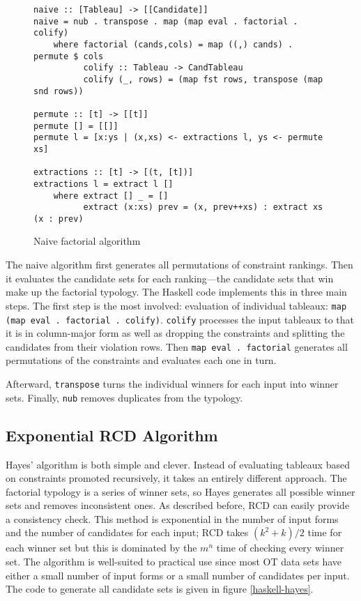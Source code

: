 \documentclass[11pt]{article}
\begin{document}
  \begin{figure}
\begin{verbatim}
naive :: [Tableau] -> [[Candidate]]
naive = nub . transpose . map (map eval . factorial . colify)
    where factorial (cands,cols) = map ((,) cands) . permute $ cols
          colify :: Tableau -> CandTableau
          colify (_, rows) = (map fst rows, transpose (map snd rows))

permute :: [t] -> [[t]]
permute [] = [[]]
permute l = [x:ys | (x,xs) <- extractions l, ys <- permute xs]

extractions :: [t] -> [(t, [t])]
extractions l = extract l []
    where extract [] _ = []
          extract (x:xs) prev = (x, prev++xs) : extract xs (x : prev)
\end{verbatim}
  \caption{Naive factorial algorithm}
  \label{naive-factorial-haskell2}
\end{figure}

The naive algorithm first generates all permutations of constraint
rankings. Then it evaluates the candidate sets for each ranking---the
candidate sets that win make up the factorial typology. The Haskell
code implements this in three main steps. The first step is the most
involved: evaluation of individual tableaux:
\verb+map (map eval . factorial . colify)+. {\tt colify}
 processes the input tableaux to that it is in column-major form as
 well as dropping the constraints and splitting the candidates
from their violation rows. Then {\tt map eval . factorial} generates
all permutations of the constraints and evaluates each one in turn.

Afterward, {\tt transpose} turns the individual winners for each input
into winner sets. Finally, {\tt nub} removes duplicates
from the typology.


\subsection{Exponential RCD Algorithm}

Hayes' algorithm is both simple and clever. Instead of evaluating
tableaux based on constraints promoted recursively, it takes an
entirely different approach. The factorial typology is a series of
winner sets, so Hayes generates all possible winner sets and removes
inconsistent ones. As described before, RCD can easily provide a
consistency check. This method is exponential in the number of input
forms and the number of candidates for each input; RCD takes $(k^2 + k)
/ 2$ time for each winner set but this is dominated by the $m^n$ time
of checking every winner set. The algorithm is well-suited to
practical use since most OT data sets have either a small number of
input forms or a small number of candidates per input. The code to
generate all candidate sets is given in figure \ref{haskell-hayes}.
\end{document}
